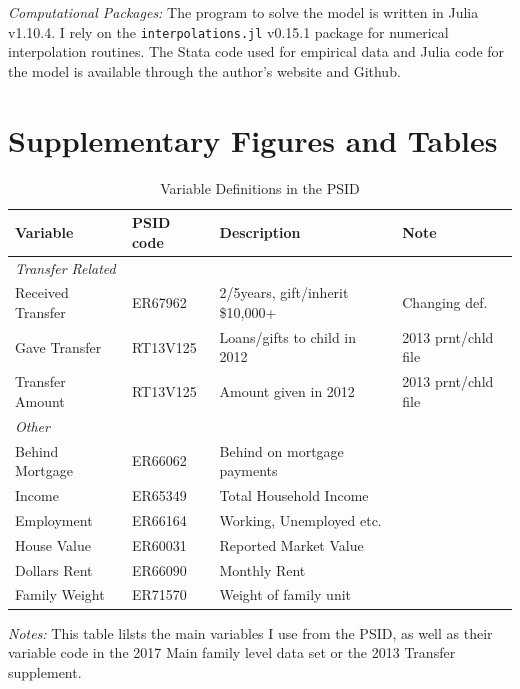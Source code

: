 \documentclass[12pt]{article}
\begin{document}
\textit{Computational Packages:}
The program to solve the model is written in Julia v1.10.4. I rely on the \texttt{interpolations.jl} v0.15.1 package for numerical interpolation routines. The Stata code used for empirical data and Julia code for the model is available through the author's website and Github.



\section{Supplementary Figures and Tables}
\begin{table}
	\small	
	\caption{Variable Definitions in the PSID}\label{tab:vardef}
	\begin{threeparttable}
	\begin{tabular}{@{}llll@{}}
		\toprule
		Variable& PSID code & Description & Note \\ \midrule
		\textit{Transfer Related} \\ 
		Received Transfer & ER67962 & 2/5years, gift/inherit \$10,000+ & Changing def. \\
		Gave Transfer & RT13V125 & Loans/gifts to child in 2012 & 2013
		prnt/chld file \\ 
		Transfer Amount & RT13V125 & Amount given in 2012 & 2013 prnt/chld file \\
		\textit{Other} \\ 
		Behind Mortgage & ER66062 & Behind on mortgage payments\\
		Income & ER65349 & Total Household Income & \\
		Employment & ER66164 & Working, Unemployed etc. \\
		House Value & ER60031 & Reported Market Value & \\
		Dollars Rent &	ER66090 & Monthly Rent\\
		Family Weight &		ER71570 & Weight of family unit & \\
		\bottomrule
	\end{tabular}
	{\textit{Notes:} This table lilsts the main variables I use from the PSID, as well as their variable code in the 2017 Main family level data set or the 2013 Transfer supplement.}
	\end{threeparttable}
	
\end{table}
\end{document}
